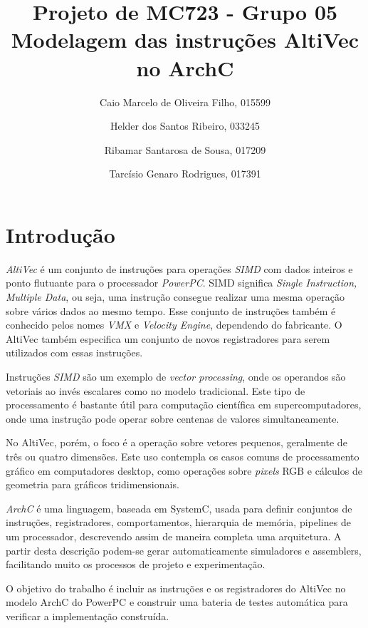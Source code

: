 \documentclass[twocolumn]{article}
\newcommand{\tech}[1]{\textit{#1}}
\begin{document}
\title{Projeto de MC723 - Grupo 05\\ Modelagem das instruções AltiVec no ArchC}
\author{
Caio Marcelo de Oliveira Filho, 015599 \and
Helder dos Santos Ribeiro, 033245 \and
Ribamar Santarosa de Sousa, 017209 \and 
Tarcísio Genaro Rodrigues, 017391
}

\date{}
\maketitle

\section{Introdução}

\tech{AltiVec} é um conjunto de instruções para operações \tech{SIMD} com dados
inteiros e ponto flutuante para o processador \tech{PowerPC}. SIMD significa
\emph{Single Instruction, Multiple Data}, ou seja, uma instrução consegue
realizar uma mesma operação sobre vários dados ao mesmo tempo. Esse conjunto de
instruções também é conhecido pelos nomes \tech{VMX} e \tech{Velocity Engine},
dependendo do fabricante. O AltiVec também especifica um conjunto de novos
registradores para serem utilizados com essas instruções.

Instruções \emph{SIMD} são um exemplo de \emph{vector processing}, onde os
operandos são vetoriais ao invés escalares como no modelo tradicional. Este
tipo de processamento é bastante útil para computação científica em
supercomputadores, onde uma instrução pode operar sobre centenas de valores
simultaneamente.

No AltiVec, porém, o foco é a operação sobre vetores pequenos, geralmente de
três ou quatro dimensões. Este uso contempla os casos comuns de processamento
gráfico em computadores desktop, como operações sobre \emph{pixels} RGB e
cálculos de geometria para gráficos tridimensionais.

\tech{ArchC} é uma linguagem, baseada em SystemC, usada para definir conjuntos
de instruções, registradores, comportamentos, hierarquia de memória, pipelines
de um processador, descrevendo assim de maneira completa uma arquitetura. A
partir desta descrição podem-se gerar automaticamente simuladores e assemblers,
facilitando muito os processos de projeto e experimentação.

O objetivo do trabalho é incluir as instruções e os registradores do AltiVec no
modelo ArchC do PowerPC e construir uma bateria de testes automática para
verificar a implementação construída.
\end{document}
